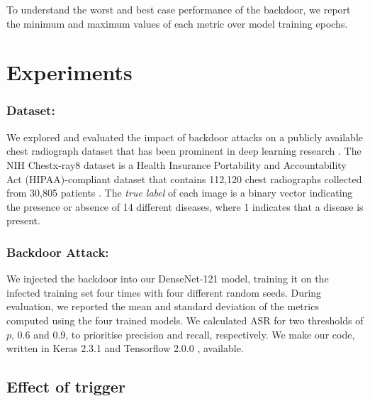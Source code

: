 \documentclass[letterpaper]{article} %
\begin{document}
To understand the worst and best case performance of the backdoor, we report the minimum and maximum values of each metric over model training epochs.
 

\section{Experiments}

\subsubsection{Dataset:} We explored and evaluated the impact of backdoor attacks on a publicly available chest radiograph dataset that has been prominent in deep learning research \cite{singh2018deep,zhang2020secret}. The NIH Chestx-ray8 dataset is a Health Insurance Portability and Accountability Act (HIPAA)-compliant dataset that contains 112,120 chest radiographs collected from 30,805 patients \cite{wang2017chestx}.  The \textit{true label} of each image is a binary vector indicating the presence or absence of 14 different diseases, where 1 indicates that a disease is present. 
 
 
 

\subsubsection{Backdoor Attack:}
 
We injected the backdoor into our DenseNet-121 model, training it on the infected training set four times with four different random seeds. During evaluation, we reported the mean and standard deviation of the metrics computed using the four trained models. We calculated ASR for two thresholds of $p$, 0.6 and 0.9, to prioritise precision and recall, respectively. We make our code, written in Keras 2.3.1 \cite{chollet2018keras} and Tensorflow 2.0.0 \cite{abadi2016tensorflow}, available.


\subsection{Effect of trigger}
\end{document}

